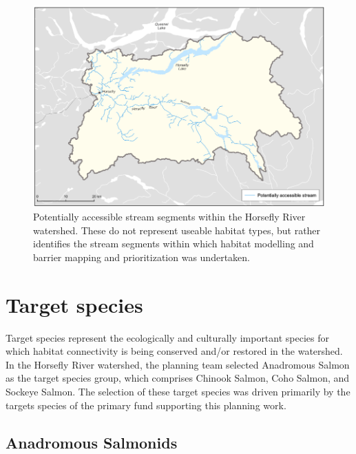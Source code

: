 \documentclass[
  letterpaper,
  DIV=11,
  numbers=noendperiod]{scrreprt}
\begin{document}
\begin{figure}

{\centering \includegraphics{images/figure2.png}

}

\caption{\label{fig-strseg}Potentially accessible stream segments within
the Horsefly River watershed. These do not represent useable habitat
types, but rather identifies the stream segments within which habitat
modelling and barrier mapping and prioritization was undertaken.}

\end{figure}

\hypertarget{target-species}{%
\section*{Target species}\label{target-species}}


Target species represent the ecologically and culturally important
species for which habitat connectivity is being conserved and/or
restored in the watershed. In the Horsefly River watershed, the planning
team selected Anadromous Salmon as the target species group, which
comprises Chinook Salmon, Coho Salmon, and Sockeye Salmon. The selection
of these target species was driven primarily by the targets species of
the primary fund supporting this planning work.

\hypertarget{anadromous-salmonids}{%
\subsection*{Anadromous Salmonids}\label{anadromous-salmonids}}
\end{document}
